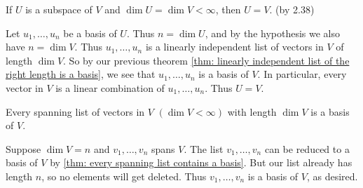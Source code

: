 \begin{thm}  
  \label{thm: subspace of full dimension equals the whole space}
  If $U$ is a subspace of $V$ and $\dim U = \dim V<\infty$, then $U=V$. (by 2.38)
\end{thm}
\begin{prf}
  Let $u_1, \ldots, u_n$ be a basis of $U$. Thus $n = \dim U$, and by the hypothesis we also have $n = \dim V$. Thus $u_1, \ldots, u_n$ is a linearly independent list of vectors in $V$ of length $\dim V$. So by our previous theorem \ref{thm: linearly independent list of the right length is a basis}, we see that $u_1, \ldots, u_n$ is a basis of $V$. In particular, every vector in $V$ is a linear combination of $u_1, \ldots, u_n$. Thus $U=V$.
\end{prf}

\setcounter{thm}{41} 
\begin{thm} 
  \label{thm: spanning list of the right length}
  Every spanning list of vectors in $V$ $(\dim V < \infty)$ with length $\dim V$ is a basis of $V$.
\end{thm}
\begin{prf}
  Suppose $\dim V = n$ and $v_1, \ldots, v_n$ spans $V$. The list $v_1, \ldots, v_n$ can be reduced to a basis of $V$ by \ref{thm: every spanning list contains a basis}. But our list already has length $n$, so no elements will get deleted. Thus $v_1, \ldots, v_n$ is a basis of $V$, as desired.
\end{prf}

